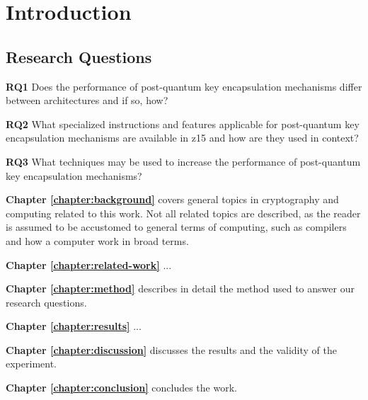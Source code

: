 \chapter{Introduction}
\label{chapter:introduction}

\section{Research Questions}
\label{section:introduction:research-questions}

\noindent\textbf{RQ1} Does the performance of \gls{post-quantum} key encapsulation mechanisms differ between architectures and if so, how?\label{rq1}\hfill\par
\noindent\textbf{RQ2} What specialized instructions and features applicable for \gls{post-quantum} key encapsulation mechanisms are available in \gls{z15} and how are they used in context?\label{rq2}\hfill\par
\noindent\textbf{RQ3} What techniques may be used to increase the performance of \gls{post-quantum} key encapsulation mechanisms?\label{rq3}\hfill\par



\noindent\textbf{Chapter \ref{chapter:background}} covers general topics in cryptography and computing related to this work. Not all related topics are described, as the reader is assumed to be accustomed to general terms of computing, such as compilers and how a computer work in broad terms.

\noindent\textbf{Chapter \ref{chapter:related-work}} ...

\noindent\textbf{Chapter \ref{chapter:method}} describes in detail the method used to answer our research questions.

\noindent\textbf{Chapter \ref{chapter:results}} ...

\noindent\textbf{Chapter \ref{chapter:discussion}} discusses the results and the validity of the experiment.

\noindent\textbf{Chapter \ref{chapter:conclusion}} concludes the work.
